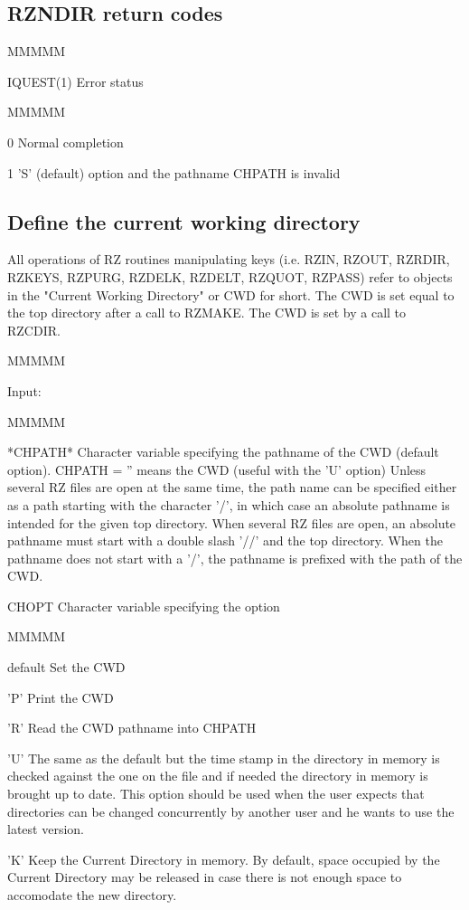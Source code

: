 \subsection{RZNDIR return codes}
\begin{DL}{MMMMM}
\item[IQUEST(1)
]Error status
\begin{DL}{MMMMM}
\item[ 0
]Normal completion
\item[ 1
]'S' (default) option and the pathname CHPATH is invalid
\end{DL}
\end{DL}
\subsection{Define the current working directory}
\par All operations of RZ routines manipulating keys
(i.e. RZIN, RZOUT, RZRDIR, RZKEYS, RZPURG, RZDELK, RZDELT, RZQUOT,
RZPASS) refer to objects in
the "Current Working Directory" or CWD for short. The CWD is set equal
to the top directory after a call to RZMAKE.
The CWD is set by a call to RZCDIR.
\begin{DL}{MMMMM}
\item[Input:
]
\begin{DL}{MMMMM}
\item[*CHPATH*
]Character variable specifying the pathname of the CWD (default
option).
\newline CHPATH = '' means the CWD (useful with the 'U' option)
\newline
Unless several RZ files are open at the same time, the path name can
be specified either as a path starting with the character '/', in
which case an absolute pathname is intended for the given top directory.
When several RZ files are open, an absolute pathname must start with a
double slash '//' and the top directory.
When the pathname does not start with a '/', the pathname is prefixed
with the path of the CWD.
\item[CHOPT
]Character variable specifying the option
\begin{DL}{MMMMM}
\item[default
]Set the CWD
\item['P'
]Print the CWD
\item['R'
]Read the CWD pathname into CHPATH
\item['U'
]The same as the default but the time stamp in the
directory in memory is checked against the one on the file and if
needed the directory in memory is brought up to date.
This option should be used when the user expects that directories can be
changed concurrently by another user and he wants to use the latest
version.
\item['K'
]Keep the Current Directory in memory. By default, space occupied
by the Current Directory may be released in case there is not enough
space to accomodate the new directory.
\end{DL}
\end{DL}
\end{DL}

